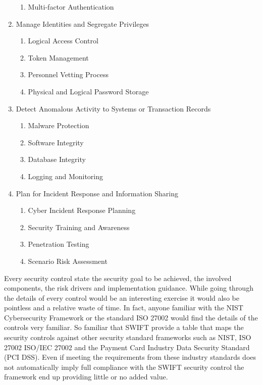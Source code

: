 \documentclass[12pt]{article}
\begin{document}
\begin{enumerate}
\begin{enumerate}
                \item Multi-factor Authentication
            \end{enumerate}
        \item Manage Identities and Segregate Privileges
            \begin{enumerate}
                \item Logical Access Control
                \item Token Management
                \item Personnel Vetting Process
                \item Physical and Logical Password Storage
            \end{enumerate}
        \item Detect Anomalous Activity to Systems or Transaction Records
            \begin{enumerate}
                \item Malware Protection
                \item Software Integrity
                \item Database Integrity
                \item Logging and Monitoring
            \end{enumerate}
        \item Plan for Incident Response and Information Sharing
            \begin{enumerate}
                \item Cyber Incident Response Planning
                \item Security Training and Awareness
                \item Penetration Testing
                \item Scenario Risk Assessment
            \end{enumerate}
        \end{enumerate}

        Every security control state the security goal to be achieved, the involved components, the risk drivers and implementation guidance. While going through the details of every control would be an interesting exercise it would also be pointless and a relative waste of time. In fact, anyone familiar with the NIST Cybersecurity Framework or the standard ISO 27002 would find the details of the controls very familiar. So familiar that SWIFT provide a table that maps the security controls against other security standard frameworks such as NIST, ISO 27002 ISO/IEC 27002 and the Payment Card Industry Data Security Standard (PCI DSS). Even if meeting the requirements from these industry standards does not automatically imply full compliance with the SWIFT security control the framework end up providing little or no added value.
        
\end{document}
